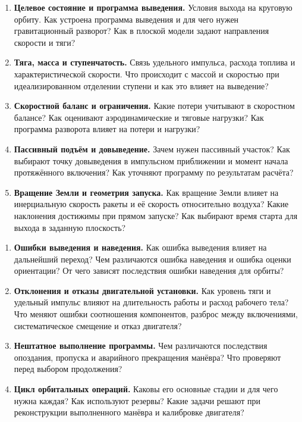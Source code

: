 \documentclass[11pt,a4paper]{article}
\begin{document}
\begin{enumerate}[resume=topics]
\item \textbf{Целевое состояние и программа выведения.} Условия выхода
на круговую орбиту. Как устроена программа выведения и для чего нужен
гравитационный разворот? Как в плоской модели задают направления скорости и тяги?
\item \textbf{Тяга, масса и ступенчатость.} Связь удельного импульса, расхода
топлива и характеристической скорости. Что происходит с массой и скоростью
при идеализированном отделении ступени и как это влияет на выведение?
\item \textbf{Скоростной баланс и ограничения.} Какие потери учитывают
в скоростном балансе? Как оценивают аэродинамические и тяговые нагрузки?
Как программа разворота влияет на потери и нагрузки?
\item \textbf{Пассивный подъём и довыведение.} Зачем нужен пассивный участок?
Как выбирают точку довыведения в импульсном приближении и момент начала
протяжённого включения? Как уточняют программу по результатам расчёта?
\item \textbf{Вращение Земли и геометрия запуска.} Как вращение Земли влияет
на инерциальную скорость ракеты и её скорость относительно воздуха?
Какие наклонения достижимы при прямом запуске? Как выбирают время старта
для выхода в заданную плоскость?
\end{enumerate}

\begin{enumerate}[resume=topics]
\item \textbf{Ошибки выведения и наведения.} Как ошибка выведения влияет
на дальнейший переход? Чем различаются ошибка наведения и ошибка оценки
ориентации? От чего зависят последствия ошибки наведения для орбиты?
\item \textbf{Отклонения и отказы двигательной установки.} Как уровень тяги
и удельный импульс влияют на длительность работы и расход рабочего тела?
Что меняют ошибки соотношения компонентов, разброс между включениями,
систематическое смещение и отказ двигателя?
\item \textbf{Нештатное выполнение программы.} Чем различаются последствия
опоздания, пропуска и аварийного прекращения манёвра? Что проверяют перед
выбором продолжения?
\item \textbf{Цикл орбитальных операций.} Каковы его основные стадии и для
чего нужна каждая? Как используют резервы? Какие задачи решают при
реконструкции выполненного манёвра и калибровке двигателя?
\end{enumerate}
\end{document}
